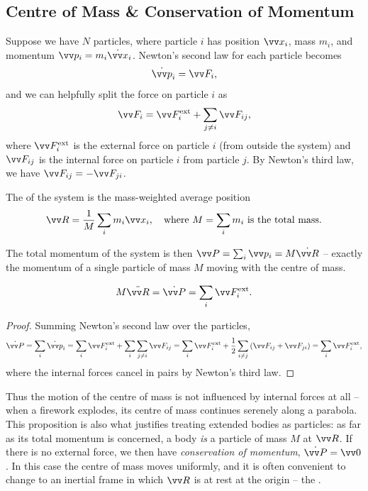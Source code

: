 \subsection{Centre of Mass \& Conservation of Momentum}

Suppose we have $N$ particles, where particle $i$ has position $\vv x_i$, mass $m_i$, and momentum $\vv p_i = m_i \dot{\vv x}_i$. Newton's second law for each particle becomes
$$
\dot{\vv p}_i = \vv F_i,
$$
and we can helpfully split the force on particle $i$ as
$$
\vv F_i = \vv F_i^{\text{ext}} + \sum_{j \neq i} \vv F_{ij},
$$
where $\vv F_i^{\text{ext}}$ is the external force on particle $i$ (from outside the system) and $\vv F_{ij}$ is the internal force on particle $i$ from particle $j$. By Newton's third law, we have $\vv F_{ij} = - \vv F_{ji}$.

\begin{definition}
	The  of the system is the mass-weighted average position
	$$
	\vv R = \frac{1}{M} \sum_i m_i \vv x_i, \quad \text{where } M = \sum_i m_i \text{ is the total mass}.
	$$
\end{definition}

The total momentum of the system is then $\vv P = \sum_i \vv p_i = M \dot{\vv R}$ -- exactly the momentum of a single particle of mass $M$ moving with the centre of mass.

\begin{proposition}
	$$
	M \ddot{\vv R} = \dot{\vv P} = \sum_i \vv F_i^{\text{ext}}.
	$$
\end{proposition}
\begin{proof}
	Summing Newton's second law over the particles,
	$$
	\dot{\vv P} = \sum_i \dot{\vv p}_i = \sum_i \vv F_i^{\text{ext}} + \sum_i \sum_{j \neq i} \vv F_{ij} = \sum_i \vv F_i^{\text{ext}} + \frac{1}{2}\sum_{i \neq j}\left(\vv F_{ij} + \vv F_{ji}\right) = \sum_i \vv F_i^{\text{ext}},
	$$
	where the internal forces cancel in pairs by Newton's third law.
\end{proof}

Thus the motion of the centre of mass is not influenced by internal forces at all -- when a firework explodes, its centre of mass continues serenely along a parabola. This proposition is also what justifies treating extended bodies as particles: as far as its total momentum is concerned, a body \emph{is} a particle of mass $M$ at $\vv R$. If there is no external force, we then have \emph{conservation of momentum}, $\dot{\vv P} = \vv 0$. In this case the centre of mass moves uniformly, and it is often convenient to change to an inertial frame in which $\vv R$ is at rest at the origin -- the .

